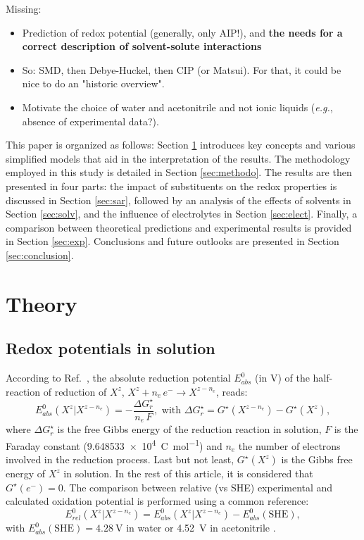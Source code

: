 \documentclass[review]{elsarticle}
\begin{document}
Missing:\begin{itemize}
	\item Prediction of redox potential (generally, only AIP!), and \textbf{the needs for a correct description of solvent-solute interactions}
	\item So: SMD, then Debye-Huckel, then CIP (or Matsui). For that, it could be nice to do an "historic overview".
	\item Motivate the choice of water and acetonitrile and not ionic liquids (\textit{e.g.}, absence of experimental data?).
\end{itemize}

This paper is organized as follows: Section \ref{sec:theory} introduces key concepts and various simplified models that aid in the interpretation of the results. The methodology employed in this study is detailed in Section \ref{sec:methodo}. The results are then presented in four parts: the impact of substituents on the redox properties is discussed in Section \ref{sec:sar}, followed by an analysis of the effects of solvents in Section \ref{sec:solv}, and the influence of electrolytes in Section \ref{sec:elect}. Finally, a comparison between theoretical predictions and experimental results is provided in Section \ref{sec:exp}. Conclusions and future outlooks are presented in Section \ref{sec:conclusion}.

\section{Theory}\label{sec:theory}

\subsection{Redox potentials in solution}

According to Ref.~\cite{marenichComputationalElectrochemistryPrediction2014}, the absolute reduction potential $E_{abs}^0$ (in \si{\volt}) of the half-reaction of reduction of $X^z$, $X^{z} + n_e\,e^- \rightarrow X^{z-n_e}$, reads: \begin{equation}
	E_{abs}^0(X^{z}|X^{z-n_e}) = -\frac{\Delta G_{r}^\star}{n_e\,F}, \text{ with } \Delta G_{r}^\star = G^\star(X^{z-n_e}) - G^\star(X^z), \label{eq:nernst}
\end{equation}
where $\Delta G_{r}^\star$ is the free Gibbs energy of the reduction reaction in solution, $F$ is the Faraday constant (\SI{9.648533e4}{\coulomb\per\mole}) and $n_e$ the number of electrons involved in the reduction process. Last but not least, $G^\star(X^z)$ is the Gibbs free energy of $X^z$ in solution.  In the rest of this article, it is considered that $G^\star(e^-) = 0$.
The comparison between relative (vs SHE) experimental and calculated oxidation potential is performed using a common reference:\begin{equation}
	E^0_{rel}(X^z|X^{z-n_e})  = E^0_{abs}(X^z|X^{z-n_e}) - E^{0}_{abs}(\text{SHE}), \label{eq:ecalc}
\end{equation}
with $E^0_{abs}(\text{SHE}) = \SI{4.28}{\volt}$ in water or \SI{4.52}{\volt} in acetonitrile \cite{marenichComputationalElectrochemistryPrediction2014}.
\end{document}

